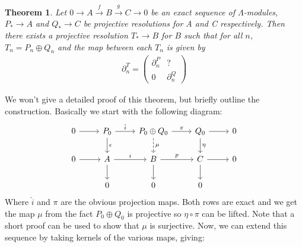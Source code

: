 \documentclass[12pt]{book}
\newtheorem{theorem}{Theorem}[chapter]
\theoremstyle{definition}
\begin{document}
\begin{theorem}
    Let $0 \rightarrow A \xrightarrow{f} B \xrightarrow{g} C \rightarrow 0$ be an exact sequence of $\Lambda$-modules, $P_* \rightarrow A$ and $Q_* \rightarrow C$ be projective resolutions for A and C respectively. Then there exists a projective resolution $T_* \rightarrow B$ for $B$ such that for all $n$, $T_n = P_n \oplus Q_n$ and the map between each $T_n$ is given by 
    \begin{align*}
        \partial^T_n = 
        \begin{pmatrix}
            \partial^P_n & ? \\
            0            & \partial^Q_n
        \end{pmatrix} 
    \end{align*} 
\end{theorem}
We won't give a detailed proof of this theorem, but briefly outline the construction. Basically we start with the following diagram: 
\[
\begin{tikzcd}
    0 \arrow[r] & P_0 \arrow[d, "\epsilon"] \arrow[r, "\hat{i}"] & P_0 \oplus Q_0 \arrow[d, dashed, "\mu"] \arrow[r, "\pi"] & Q_0 \arrow[r] \arrow[d, "\eta"] & 0 \\
    0 \arrow[r] & A \arrow[d] \arrow[r, "i"] & B \arrow[d] \arrow[r, "p"] & C \arrow[r] \arrow[d] & 0 \\
    & 0 & 0 & 0 
\end{tikzcd}
\]
Where $\hat{i}$ and $\pi$ are the obvious projection maps. Both rows are exact and we get the map $\mu$ from the fact $P_0 \oplus Q_0$ is projective so $\eta \circ \pi$ can be lifted. Note that a short proof can be used to show that $\mu$ is surjective. Now, we can extend this sequence by taking kernels of the various maps, giving: 
\end{document}
